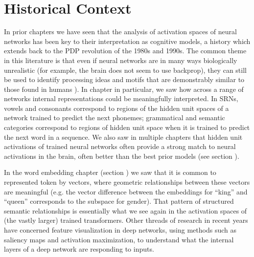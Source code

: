 \section{Historical Context}\label{mechInterpHist}

In prior chapters we have seen that the analysis of activation spaces of neural networks has been key to their interpretation as cognitive models, a history which extends back to the PDP revolution of the 1980s and 1990s. The common theme in this literature is that even if neural networks are in many ways biologically unrealistic (for example, the brain does not seem to use backprop), they can still be used to identify processing ideas and motifs that are demonstrably similar to those found in humans \cite{zipser1992identification}). In chapter  in particular, we saw how across a range of networks internal representations could be meaningfully interpreted. In SRNs, vowels and consonants correspond to regions of the hidden unit spaces of a network trained to predict the next phonemes; grammatical and semantic categories correspond to regions of hidden unit space when it is trained to predict the next word in a sequence. We also saw in multiple chapters that hidden unit activations of trained neural networks often provide a strong match to neural activations in the brain, often better than the best prior models (see section ). 

In the word embedding chapter (section ) we saw that it is common to represented token by vectors, where geometric relationships between these vectors are meaningful (e.g. the vector difference between the embeddings for ``king'' and ``queen'' corresponds to the subspace for gender). That pattern of structured semantic relationships is essentially what we see again in the activation spaces of (the vastly larger) trained transformers. Other threads of research in recent years have concerned feature visualization in deep networks, using methods such as saliency maps and activation maximization, to understand what the internal layers of a deep network are responding to inputs.

